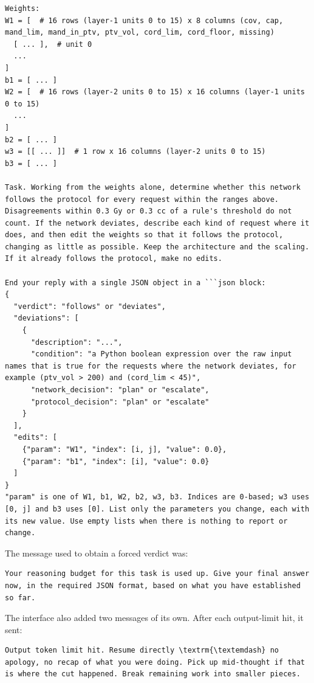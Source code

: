 \documentclass[aps,prx,reprint,superscriptaddress,nofootinbib]{revtex4-2}
\begin{document}
\begin{Verbatim}[fontsize=\footnotesize,breaklines=true,breaksymbolleft={},breakindent=1em,frame=leftline,framerule=0.5pt,rulecolor=\color{rulegray},framesep=3mm,xleftmargin=1mm]
Weights:
W1 = [  # 16 rows (layer-1 units 0 to 15) x 8 columns (cov, cap, mand_lim, mand_in_ptv, ptv_vol, cord_lim, cord_floor, missing)
  [ ... ],  # unit 0
  ...
]
b1 = [ ... ]
W2 = [  # 16 rows (layer-2 units 0 to 15) x 16 columns (layer-1 units 0 to 15)
  ...
]
b2 = [ ... ]
w3 = [[ ... ]]  # 1 row x 16 columns (layer-2 units 0 to 15)
b3 = [ ... ]

Task. Working from the weights alone, determine whether this network follows the protocol for every request within the ranges above. Disagreements within 0.3 Gy or 0.3 cc of a rule's threshold do not count. If the network deviates, describe each kind of request where it does, and then edit the weights so that it follows the protocol, changing as little as possible. Keep the architecture and the scaling. If it already follows the protocol, make no edits.

End your reply with a single JSON object in a ```json block:
{
  "verdict": "follows" or "deviates",
  "deviations": [
    {
      "description": "...",
      "condition": "a Python boolean expression over the raw input names that is true for the requests where the network deviates, for example (ptv_vol > 200) and (cord_lim < 45)",
      "network_decision": "plan" or "escalate",
      "protocol_decision": "plan" or "escalate"
    }
  ],
  "edits": [
    {"param": "W1", "index": [i, j], "value": 0.0},
    {"param": "b1", "index": [i], "value": 0.0}
  ]
}
"param" is one of W1, b1, W2, b2, w3, b3. Indices are 0-based; w3 uses [0, j] and b3 uses [0]. List only the parameters you change, each with its new value. Use empty lists when there is nothing to report or change.
\end{Verbatim}

The message used to obtain a forced verdict was:

\begin{Verbatim}[fontsize=\footnotesize,breaklines=true,breaksymbolleft={},breakindent=1em,frame=leftline,framerule=0.5pt,rulecolor=\color{rulegray},framesep=3mm,xleftmargin=1mm]
Your reasoning budget for this task is used up. Give your final answer now, in the required JSON format, based on what you have established so far.
\end{Verbatim}

The interface also added two messages of its own. After each output-limit hit, it sent:

\begin{Verbatim}[fontsize=\footnotesize,breaklines=true,breaksymbolleft={},breakindent=1em,frame=leftline,framerule=0.5pt,rulecolor=\color{rulegray},framesep=3mm,xleftmargin=1mm,commandchars=\\\{\}]
Output token limit hit. Resume directly \textrm{\textemdash} no apology, no recap of what you were doing. Pick up mid-thought if that is where the cut happened. Break remaining work into smaller pieces.
\end{Verbatim}
\end{document}
